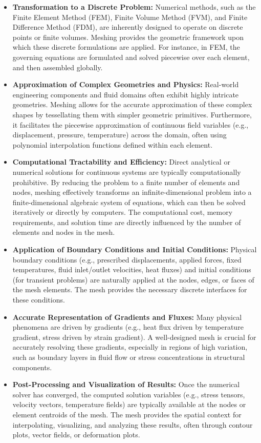 \documentclass{book}
\begin{document}
\begin{itemize}[leftmargin=*,label=\textbullet]
    \item \textbf{Transformation to a Discrete Problem:} Numerical methods, such as the Finite Element Method (FEM), Finite Volume Method (FVM), and Finite Difference Method (FDM), are inherently designed to operate on discrete points or finite volumes. Meshing provides the geometric framework upon which these discrete formulations are applied. For instance, in FEM, the governing equations are formulated and solved piecewise over each element, and then assembled globally.
    \item \textbf{Approximation of Complex Geometries and Physics:} Real-world engineering components and fluid domains often exhibit highly intricate geometries. Meshing allows for the accurate approximation of these complex shapes by tessellating them with simpler geometric primitives. Furthermore, it facilitates the piecewise approximation of continuous field variables (e.g., displacement, pressure, temperature) across the domain, often using polynomial interpolation functions defined within each element.
    \item \textbf{Computational Tractability and Efficiency:} Direct analytical or numerical solutions for continuous systems are typically computationally prohibitive. By reducing the problem to a finite number of elements and nodes, meshing effectively transforms an infinite-dimensional problem into a finite-dimensional algebraic system of equations, which can then be solved iteratively or directly by computers. The computational cost, memory requirements, and solution time are directly influenced by the number of elements and nodes in the mesh.
    \item \textbf{Application of Boundary Conditions and Initial Conditions:} Physical boundary conditions (e.g., prescribed displacements, applied forces, fixed temperatures, fluid inlet/outlet velocities, heat fluxes) and initial conditions (for transient problems) are naturally applied at the nodes, edges, or faces of the mesh elements. The mesh provides the necessary discrete interfaces for these conditions.
    \item \textbf{Accurate Representation of Gradients and Fluxes:} Many physical phenomena are driven by gradients (e.g., heat flux driven by temperature gradient, stress driven by strain gradient). A well-designed mesh is crucial for accurately resolving these gradients, especially in regions of high variation, such as boundary layers in fluid flow or stress concentrations in structural components.
    \item \textbf{Post-Processing and Visualization of Results:} Once the numerical solver has converged, the computed solution variables (e.g., stress tensors, velocity vectors, temperature fields) are typically available at the nodes or element centroids of the mesh. The mesh provides the spatial context for interpolating, visualizing, and analyzing these results, often through contour plots, vector fields, or deformation plots.
\end{itemize}
\end{document}
